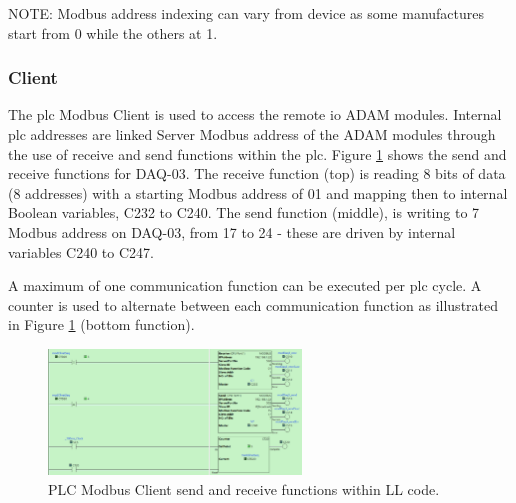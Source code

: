             NOTE: Modbus address indexing can vary from device as some manufactures start from 0 while the others at 1. 
            
        \subsubsection{Client}
            The \acrshort{plc} Modbus Client is used to access the remote \acrshort{io} ADAM modules. Internal \acrshort{plc} addresses are linked Server Modbus address of the ADAM modules through the use of receive and send functions within the \acrshort{plc}. Figure \ref{fig:plcModbusClient} shows the send and receive functions for DAQ-03. The receive function (top) is reading 8 bits of data (8 addresses) with a starting Modbus address of 01 and mapping then to internal Boolean variables, C232 to C240. The send function (middle), is writing to 7 Modbus address on DAQ-03, from 17 to 24 - these are driven by internal variables C240 to C247.

            A maximum of one communication function can be executed per \acrshort{plc} cycle. A counter is used to alternate between each communication function as illustrated in Figure \ref{fig:plcModbusClient} (bottom function).

        \begin{figure}[H]
            \centering
            \includegraphics[width = 0.6\textwidth]{2_images/plcModbusClient}
            \caption{PLC Modbus Client send and receive functions within LL code.}
            \label{fig:plcModbusClient}
        \end{figure}
            
